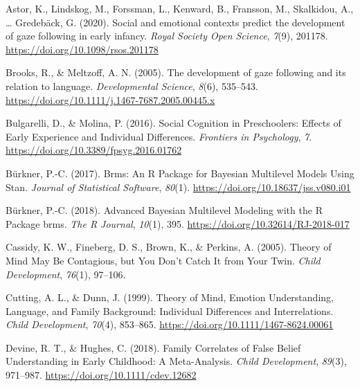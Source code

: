 \documentclass[
  man,floatsintext]{apa6}
\newlength{\cslhangindent}
\newlength{\cslentryspacingunit} %
\newenvironment{CSLReferences}[2] %
 {%
  \setlength{\parindent}{0pt}
  \ifodd #1
  \let\oldpar\par
  \def\par{\hangindent=\cslhangindent\oldpar}
  \fi
  \setlength{\parskip}{#2\cslentryspacingunit}
 }%
 {}
\begin{document}
\hypertarget{refs}{}
\begin{CSLReferences}{1}{0}
\leavevmode{}%
Astor, K., Lindskog, M., Forssman, L., Kenward, B., Fransson, M., Skalkidou, A., \ldots{} Gredebäck, G. (2020). Social and emotional contexts predict the development of gaze following in early infancy. \emph{Royal Society Open Science}, \emph{7}(9), 201178. \url{https://doi.org/10.1098/rsos.201178}

\leavevmode{}%
Brooks, R., \& Meltzoff, A. N. (2005). The development of gaze following and its relation to language. \emph{Developmental Science}, \emph{8}(6), 535--543. \url{https://doi.org/10.1111/j.1467-7687.2005.00445.x}

\leavevmode{}%
Bulgarelli, D., \& Molina, P. (2016). Social {Cognition} in {Preschoolers}: {Effects} of {Early Experience} and {Individual Differences}. \emph{Frontiers in Psychology}, \emph{7}. \url{https://doi.org/10.3389/fpsyg.2016.01762}

\leavevmode{}%
Bürkner, P.-C. (2017). Brms: {An R Package} for {Bayesian Multilevel Models Using Stan}. \emph{Journal of Statistical Software}, \emph{80}(1). \url{https://doi.org/10.18637/jss.v080.i01}

\leavevmode{}%
Bürkner, P.-C. (2018). Advanced {Bayesian Multilevel Modeling} with the {R Package} brms. \emph{The R Journal}, \emph{10}(1), 395. \url{https://doi.org/10.32614/RJ-2018-017}

\leavevmode{}%
Cassidy, K. W., Fineberg, D. S., Brown, K., \& Perkins, A. (2005). Theory of {Mind May Be Contagious}, but {You Don}'t {Catch It} from {Your Twin}. \emph{Child Development}, \emph{76}(1), 97--106.

\leavevmode{}%
Cutting, A. L., \& Dunn, J. (1999). Theory of {Mind}, {Emotion Understanding}, {Language}, and {Family Background}: {Individual Differences} and {Interrelations}. \emph{Child Development}, \emph{70}(4), 853--865. \url{https://doi.org/10.1111/1467-8624.00061}

\leavevmode{}%
Devine, R. T., \& Hughes, C. (2018). Family {Correlates} of {False Belief Understanding} in {Early Childhood}: {A Meta-Analysis}. \emph{Child Development}, \emph{89}(3), 971--987. \url{https://doi.org/10.1111/cdev.12682}


\end{CSLReferences}
\end{document}
